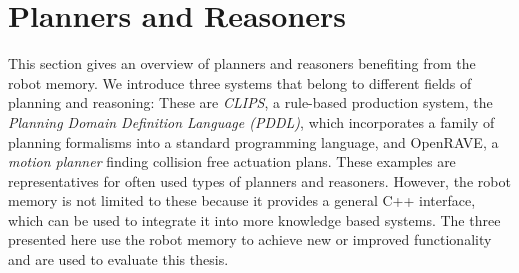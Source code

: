 \section{Planners and Reasoners}
\label{sec:planners}
This section gives an overview of planners and reasoners benefiting
from the robot memory. We introduce three systems that belong to
different fields of planning and reasoning: These are \emph{CLIPS}, a
rule-based production system, the \emph{Planning Domain Definition
  Language (PDDL)}, which incorporates a family of planning formalisms
into a standard programming language, and OpenRAVE, a \emph{motion
  planner} finding collision free actuation plans.  These examples are
representatives for often used types of planners and
reasoners. However, the robot memory is not limited to these because
it provides a general C++ interface, which can be used to integrate it
into more knowledge based systems. The three presented here use the robot memory
to achieve new or improved functionality and are used to evaluate this
thesis.

